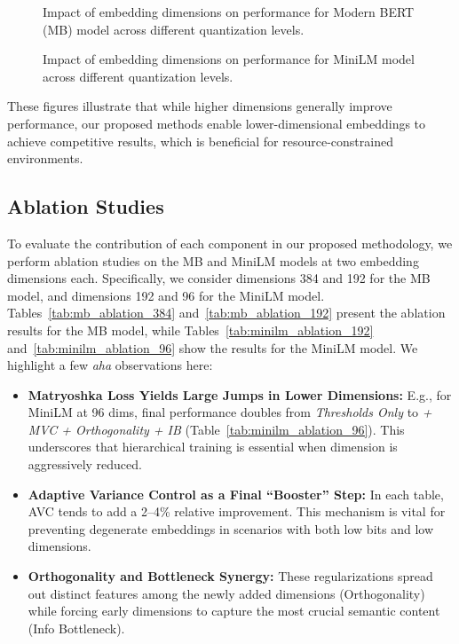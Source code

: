 \begin{figure}[ht]
    \centering
    \caption{Impact of embedding dimensions on performance for Modern BERT (MB) model across different quantization levels.}
    \label{fig:dimension_impact_mb}
\end{figure}

\begin{figure}[ht]
    \centering
    \caption{Impact of embedding dimensions on performance for MiniLM model across different quantization levels.}
    \label{fig:dimension_impact_minilm}
\end{figure}

These figures illustrate that while higher dimensions generally improve performance, our proposed methods enable lower-dimensional embeddings to achieve competitive results, which is beneficial for resource-constrained environments.

\subsection{Ablation Studies}
\label{sec:ablation_summaries}

To evaluate the contribution of each component in our proposed methodology, we perform ablation studies on the MB and MiniLM models at two embedding dimensions each. 
Specifically, we consider dimensions 384 and 192 for the MB model, and dimensions 192 and 96 for the MiniLM model. 
Tables~\ref{tab:mb_ablation_384} and~\ref{tab:mb_ablation_192} present the ablation results for the MB model, while Tables~\ref{tab:minilm_ablation_192} and~\ref{tab:minilm_ablation_96} show the results for the MiniLM model.
We highlight a few \emph{aha} observations here:
\begin{itemize}
    \item \textbf{Matryoshka Loss Yields Large Jumps in Lower Dimensions:} E.g., for MiniLM at 96 dims, final performance doubles from \textit{Thresholds Only} to \textit{+ MVC + Orthogonality + IB} (Table~\ref{tab:minilm_ablation_96}). This underscores that hierarchical training is essential when dimension is aggressively reduced.
    \item \textbf{Adaptive Variance Control as a Final “Booster” Step:} In each table, AVC tends to add a 2--4\% relative improvement. This mechanism is vital for preventing degenerate embeddings in scenarios with both low bits and low dimensions.
    \item \textbf{Orthogonality and Bottleneck Synergy:} These regularizations spread out distinct features among the newly added dimensions (Orthogonality) while forcing early dimensions to capture the most crucial semantic content (Info Bottleneck).
\end{itemize}

